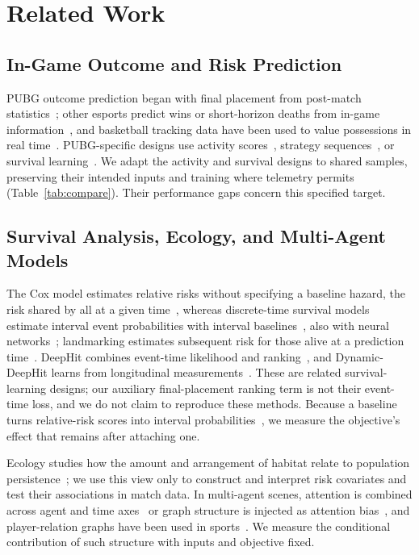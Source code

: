 \documentclass[sigconf,anonymous,nonacm]{acmart}
\begin{document}
\section{Related Work}
\label{sec:related}

\subsection{In-Game Outcome and Risk Prediction}
\label{sec:related:esports}
PUBG outcome prediction began with final placement from post-match statistics~\cite{KagglePUBG,LeeLee25}; other esports predict wins or short-horizon deaths from in-game information~\cite{Hodge21,Katona19,Marshall22}, and basketball tracking data have been used to value possessions in real time~\cite{Cervone16}.
PUBG-specific designs use activity scores~\cite{Sagong25a}, strategy sequences~\cite{Sagong25b}, or survival learning~\cite{KRAFTON}. We adapt the activity and survival designs to shared samples, preserving their intended inputs and training where telemetry permits (Table~\ref{tab:compare}). Their performance gaps concern this specified target.
\subsection{Survival Analysis, Ecology, and Multi-Agent Models}
\label{sec:related:survival}
The Cox model estimates relative risks without specifying a baseline hazard, the risk shared by all at a given time~\cite{Cox72}, whereas discrete-time survival models estimate interval event probabilities with interval baselines~\cite{SingerWillett93}, also with neural networks~\cite{Gensheimer19}; landmarking estimates subsequent risk for those alive at a prediction time~\cite{vanHouwelingen07}.
DeepHit combines event-time likelihood and ranking~\cite{DeepHit18}, and Dynamic-DeepHit learns from longitudinal measurements~\cite{DynamicDeepHit20}. These are related survival-learning designs; our auxiliary final-placement ranking term is not their event-time loss, and we do not claim to reproduce these methods.
Because a baseline turns relative-risk scores into interval probabilities~\cite{PrenticeGloeckler78}, we measure the objective's effect that remains after attaching one.

Ecology studies how the amount and arrangement of habitat relate to population persistence~\cite{Fahrig03}; we use this view only to construct and interpret risk covariates and test their associations in match data.
In multi-agent scenes, attention is combined across agent and time axes~\cite{Ngiam22} or graph structure is injected as attention bias~\cite{Ying21}, and player-relation graphs have been used in sports~\cite{Xenopoulos21}.
We measure the conditional contribution of such structure with inputs and objective fixed.
\end{document}
